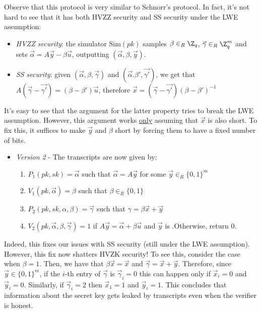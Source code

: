 \documentclass[a4paper, 12pt]{report}
\begin{document}
    Observe that this protocol is very similar to Schnorr's protocol. In fact, it's not hard to see that it has both HVZZ security and SS security under the LWE assumption:
    \begin{itemize}
        \item \textit{HVZZ security}: the simulator $\mathrm{Sim}(pk)$ samples $\beta \in_R \Z_q$, $\vec \gamma \in_R \Z_q^m$ and sets $\vec \alpha = A \vec y - \beta \vec u$, outputting $(\vec \alpha, \beta, \vec y)$.
        \item \textit{SS security}: given $(\vec \alpha, \beta, \vec \gamma)$ and $(\vec \alpha. \beta', \vec{\gamma '})$, we get that $A(\vec \gamma - \vec{\gamma'}) = (\beta - \beta') \vec u$, therefore $\vec x = (\vec \gamma - \vec{\gamma'})(\beta - \beta')^{-1}$
    \end{itemize}

    It's easy to see that the argument for the latter property tries to break the LWE assumption. However, this argument works \underline{only} assuming that $\vec x$ is also short. To fix this, it suffices to make $\vec y$ and $\beta$ short by forcing them to have a fixed number of bits.
    \begin{itemize}
        \item \textit{Version 2} - The transcripts are now given by:
        \begin{enumerate}
            \item $P_1(pk,sk) = \vec \alpha$ such that $\vec \alpha = A \vec y$ for some $\vec y \in_R \{0,1\}^m$
            \item $V_1(pk, \vec \alpha) = \beta$ such that $\beta \in_R \{0,1\}$
            \item $P_2(pk,sk,\alpha, \beta) = \vec\gamma$ such that $\gamma = \beta \vec x + \vec y$
            \item $V_2(pk, \vec\alpha, \beta, \vec\gamma) = 1$ if $A \vec y = \vec \alpha + \beta \vec u$ and $\vec y$ is .Otherwise, return $0$.
        \end{enumerate}
    \end{itemize}

    Indeed, this fixes our issues with SS security (still under the LWE assumption). However, this fix now shatters HVZK security! To see this, consider the case when $\beta = 1$. Then, we have that $\beta \vec x = \vec x$ and $\vec \gamma = \vec x + \vec y$. Therefore, since $\vec y \in \{0,1\}^m$, if the $i$-th entry of $\vec \gamma$ is $\vec \gamma_i = 0$ this can happen only if $\vec x_i = 0$ and $\vec y_i = 0$. Similarly, if $\vec \gamma_i = 2$ then $\vec x_1 = 1$ and $\vec y_i = 1$. This concludes that information about the secret key gets leaked by transcripts even when the verifier is honest.
\end{document}

